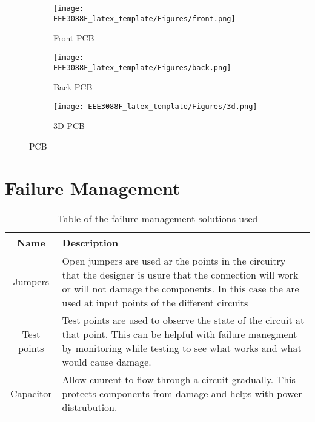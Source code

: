 \documentclass[class=report,11pt,crop=false]{standalone}
\begin{document}
\begin{figure}[h]
     \centering
    \begin{subfigure}[b]{0.3\linewidth}
        \texttt{[image: EEE3088F\_latex\_template/Figures/front.png]}
        \caption{Front PCB}
        \label{fig:PCB_front}
    \end{subfigure}
    \hfill %
    \begin{subfigure}[b]{0.3\linewidth}
        \texttt{[image: EEE3088F\_latex\_template/Figures/back.png]}
        \caption{Back PCB}
        \label{fig:PCB_back}
    \end{subfigure}
    \hfill %
    \begin{subfigure}[b]{0.3\linewidth}
        \texttt{[image: EEE3088F\_latex\_template/Figures/3d.png]}
        \caption{3D PCB}
        \label{fig:PCB_3D}
    \end{subfigure}
    \caption{PCB}
    \label{fig:PCB}
\end{figure}
\section{Failure Management}

\begin{table}[h]
    \centering
    \caption{Table of the failure management solutions used} \label{tab:failuremanagement}
    \begin{tabular}{|c|m{12cm}|}
        \hline
        \textbf{Name} & \textbf{Description} \\
        \hline
         Jumpers & Open jumpers are used ar the points in the circuitry that the designer is usure that the connection will work or will not damage the components. In this case the are used at input points of the different circuits \\
         \hline
         Test points  &  Test points are used to observe the state of the circuit at that point. This can be helpful with failure manegment by monitoring while testing to see what works and what would cause damage.  \\
         \hline
         Capacitor &  Allow cuurent to flow through a circuit gradually. This protects components from damage and helps with power distrubution.\\
         \hline
    \end{tabular}
\end{table}
\end{document}
